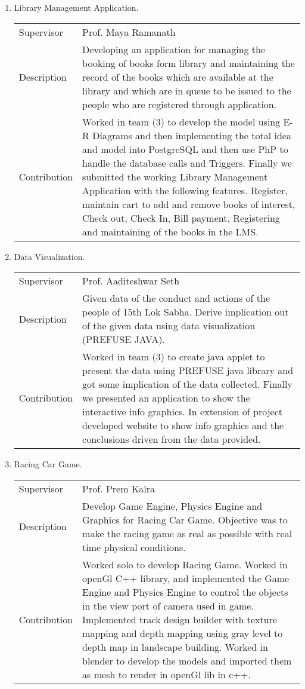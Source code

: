 \documentclass[letterpaper,11pt]{article}
\begin{document}
\begin{enumerate}
\item Library Management Application.
 \begin{center}
 \begin{tabular}{p{3cm} p{13cm} }
 Supervisor& Prof. Maya Ramanath\\
 Description& Developing an application for managing the booking of books form library and maintaining the record of the books which are available at the library and which are in queue to be issued to the people who are registered through
application.\\
Contribution&Worked in team (3) to develop the model using E-R Diagrams and then implementing the total idea and model into PostgreSQL and then use PhP to handle the database calls and Triggers. Finally we submitted the working Library
Management Application with the following features. Register, maintain cart to add and remove books of interest,
Check out, Check In, Bill payment, Registering and maintaining of the books in the LMS.\\
\end{tabular}
\end{center}

 \item Data Visualization.
 \begin{center}
 \begin{tabular}{p{3cm} p{13cm} }
 Supervisor& Prof. Aaditeshwar Seth\\
 Description&Given data of the conduct and actions of the people of 15th Lok Sabha. Derive implication out of the given data using data visualization (PREFUSE JAVA).\\
Contribution&Worked in team (3) to create java applet to present the data using PREFUSE java library and got some
implication of the data collected. Finally we presented an application to show the interactive info graphics. In
extension of project developed website to show info graphics and the conclusions driven from the data provided.\\
\end{tabular}
\end{center}

\item Racing Car Game.
 \begin{center}
 \begin{tabular}{p{3cm} p{13cm} }
 Supervisor& Prof. Prem Kalra\\
 Description&Develop Game Engine, Physics Engine and Graphics for Racing Car Game. Objective was to make the racing game as real as possible with real time physical conditions.\\
Contribution&Worked solo to develop Racing Game. Worked in openGl C++ library, and implemented the Game
Engine and Physics Engine to control the objects in the view port of camera used in game. Implemented track design
builder with texture mapping and depth mapping using gray level to depth map in landscape building. Worked in
blender to develop the models and imported them as mesh to render in openGl lib in c++.\\
\end{tabular}
\end{center}
\end{enumerate}
\end{document}

